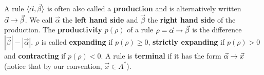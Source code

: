 A rule $\langle \vec{\alpha}, \vec{\beta}\rangle$ is often also called a
\textbf{production} and is alternatively written 
\index{$\vec{\alpha} \pf \vec{\beta}$}%
$\vec{\alpha} \pf \vec{\beta}$. We call $\vec{\alpha}$ the 
\textbf{left hand side} and $\vec{\beta}$ the \textbf{right hand 
side} of the production. The 
\textbf{productivity} $p(\rho)$ of a rule $\rho = \vec{\alpha} \pf %
\vec{\beta}$ is the
difference $|\vec{\beta}| - |\vec{\alpha}|$. $\rho$ is called
\textbf{expanding} if $p(\rho) \geq 0$, \textbf{strictly expanding}
if $p(\rho) > 0$ and \textbf{contracting} if $p(\rho) < 0$.
A rule is \textbf{terminal} if it has the form $\vec{\alpha} \rightarrow
\vec{x}$ (notice that by our convention, $\vec{x} \in A^{\ast}$).

